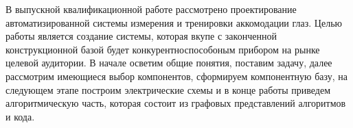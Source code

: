 В  выпускной  квалификационной  работе рассмотрено проектирование автоматизированной системы измерения и тренировки аккомодации глаз. Целью работы является создание системы, которая вкупе с законченной конструкционной базой будет конкурентноспособоным прибором на рынке целевой аудитории. В начале осветим общие понятия, поставим задачу, далее рассмотрим имеющиеся выбор компонентов, сформируем компонентную базу, на следующем этапе построим электрические схемы и в конце работы приведем алгоритмическую часть, которая состоит из графовых представлений алгоритмов и кода.



